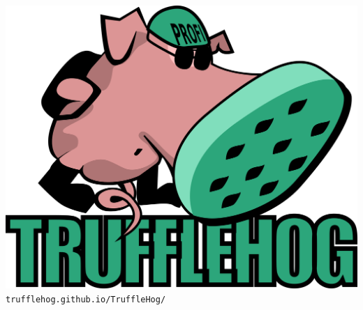 \documentclass[18pt]{beamer}
\begin{document}
\begin{frame}
	\centering
	\includegraphics[width=0.8\linewidth]{images/title}\newline
	\texttt{trufflehog.github.io/TruffleHog/}
\end{frame}

\appendix
\beginbackup


\backupend
\end{document}

